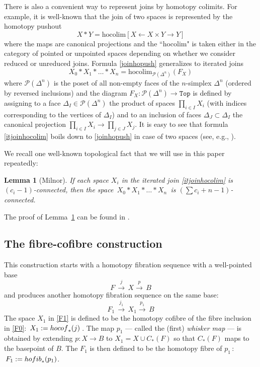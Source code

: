 \documentclass[11pt]{amsart}
\newtheorem{lemma}[theorem]{Lemma}
\theoremstyle{definition}
\theoremstyle{remark}
\numberwithin{equation}{section}
\newcommand{\la}{\label}
\newcommand{\Top}{\mathtt{Top}}
\begin{document}
There is also a convenient way to represent joins by homotopy colimits. For example, it is well-known that the join of two spaces is represented by the homotopy pushout
%
\begin{equation} 
\la{joinhopush}  
X \ast Y = \mathrm{hocolim}[X \leftarrow X \times Y \rightarrow Y] 
\end{equation}
%
where the maps are canonical projections and the ``hocolim" is taken either in the category of pointed or unpointed spaces depending on whether we consider reduced or unreduced joins. Formula \eqref{joinhopush} generalizes to iterated joins
%
\begin{equation} 
\la{itjoinhocolim} 
X_0 \ast X_1 \ast \ldots \ast X_n = \mathrm{hocolim}_{\mathscr{P}(\Delta^n)}(F_X)
\end{equation}
%
where $\mathscr{P}(\Delta^n)$ is the poset of all non-empty faces of the $n$-simplex $\Delta^n$ (ordered by reversed inclusions) and the diagram $F_X:\mathscr{P}(\Delta^n) \to \Top$ is defined by assigning to a face $\Delta_I \in \mathscr{P}(\Delta^n)$ the product of spaces $\prod_{i \in I} X_i$ (with indices corresponding to the vertices of $\Delta_I$) and to an inclusion of faces $\Delta_J \subset \Delta_I$ the canonical projection $\prod_{i \in I} X_i \to \prod_{j \in J} X_j$. It is easy to see that formula \eqref{itjoinhocolim} boils down to \eqref{joinhopush} in case of two spaces (see, e.g., \cite[Example 5.8.8]{MV15}).

We recall one well-known topological fact that we will use in this paper repeatedly:
%
\begin{lemma}[Milnor]
\la{Millemma}
If each space $X_i$ in the iterated join \eqref{itjoinhocolim} is $(c_i-1)$-connected, then
the space $ \,X_0 \ast X_1 \ast \ldots \ast X_n \,$ is $( \sum c_i + n -1)$-connected.
\end{lemma}
%
The proof of Lemma~\ref{Millemma} can be found in \cite[Proposition 3.7.23]{MV15}.

\subsection{The fibre-cofibre construction}
\la{S4.1}
This construction starts with a homotopy fibration sequence with a well-pointed base
%
\begin{equation}
\la{F0}
F\, \xrightarrow{j} \,X \xrightarrow{p} \,B
\end{equation}
%
and produces another homotopy fibration sequence on the same base:
%
\begin{equation}
\la{F1}
F_1\, \xrightarrow{j_1} \,X_1 \xrightarrow{p_1} \,B
\end{equation}
%
The space $X_1$ in \eqref{F1} is defined to be the homotopy cofibre of the 
fibre inclusion in \eqref{F0}: $\, X_1 := {\rm hocof}_*(j) \,$. 
The map $ p_1 $ --- called the (first) {\it whisker map} --- is obtained by extending  
$ p: X \to B $ to $ X_1 = X \cup C_*(F) $ so that $ C_*(F) $ maps to the basepoint of $B$. 
The  $F_1 $ is then defined to be the homotopy fibre of $p_1\,$: $\, F_1 := {\rm hofib}_*(p_1) $.
\end{document}
